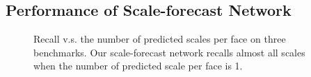 \documentclass[10pt,twocolumn,letterpaper]{article}
\begin{document}
\subsection{Performance of Scale-forecast Network}\label{sec:performance-of-scale-forecast-network}
\vspace{-.2cm}
\begin{figure}[h]
\centering 
{} 
\caption{Recall v.s. the number of predicted scales per face on three benchmarks. 
	Our scale-forecast network recalls almost all scales when the number of predicted scale per face is 1.} 
\label{scale-forcast_result} 
\end{figure}
\end{document}
